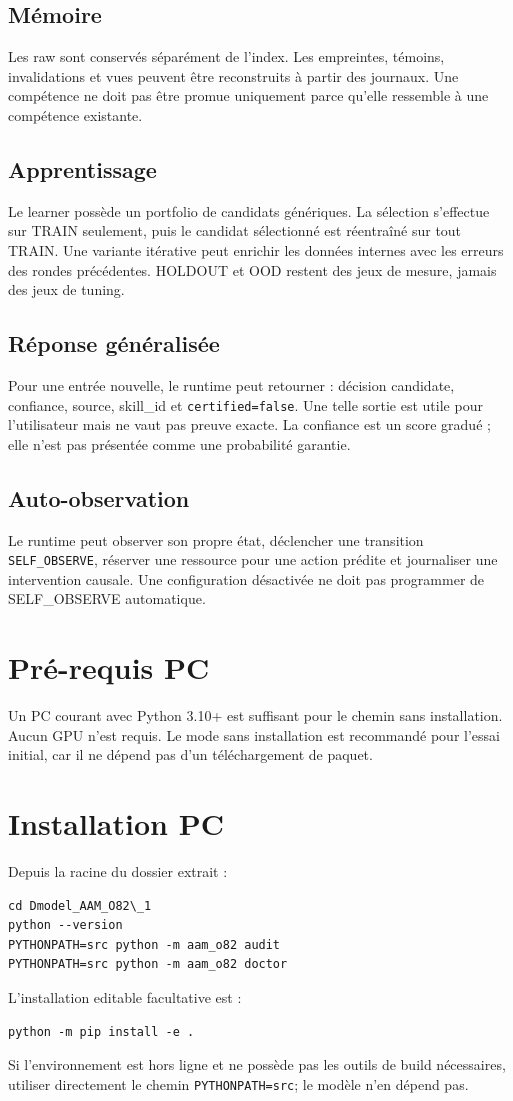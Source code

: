 \documentclass[11pt,a4paper]{report}
\begin{document}
\section{Mémoire}
Les raw sont conservés séparément de l'index. Les empreintes, témoins, invalidations et vues peuvent être reconstruits à partir des journaux. Une compétence ne doit pas être promue uniquement parce qu'elle ressemble à une compétence existante.

\section{Apprentissage}
Le learner possède un portfolio de candidats génériques. La sélection s'effectue sur TRAIN seulement, puis le candidat sélectionné est réentraîné sur tout TRAIN. Une variante itérative peut enrichir les données internes avec les erreurs des rondes précédentes. HOLDOUT et OOD restent des jeux de mesure, jamais des jeux de tuning.

\section{Réponse généralisée}
Pour une entrée nouvelle, le runtime peut retourner : décision candidate, confiance, source, skill\_id et \texttt{certified=false}. Une telle sortie est utile pour l'utilisateur mais ne vaut pas preuve exacte. La confiance est un score gradué ; elle n'est pas présentée comme une probabilité garantie.

\section{Auto-observation}
Le runtime peut observer son propre état, déclencher une transition \texttt{SELF\_OBSERVE}, réserver une ressource pour une action prédite et journaliser une intervention causale. Une configuration désactivée ne doit pas programmer de SELF\_OBSERVE automatique.

\chapter{Pré-requis PC}
Un PC courant avec Python 3.10+ est suffisant pour le chemin sans installation. Aucun GPU n'est requis. Le mode sans installation est recommandé pour l'essai initial, car il ne dépend pas d'un téléchargement de paquet.

\chapter{Installation PC}
Depuis la racine du dossier extrait :
\begin{verbatim}
cd Dmodel_AAM_O82\_1
python --version
PYTHONPATH=src python -m aam_o82 audit
PYTHONPATH=src python -m aam_o82 doctor
\end{verbatim}
L'installation editable facultative est :
\begin{verbatim}
python -m pip install -e .
\end{verbatim}
Si l'environnement est hors ligne et ne possède pas les outils de build nécessaires, utiliser directement le chemin \texttt{PYTHONPATH=src}; le modèle n'en dépend pas.
\end{document}
